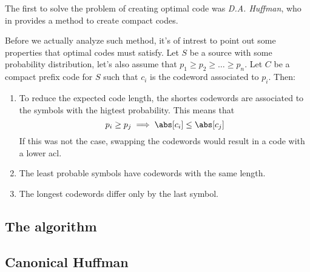 \documentclass{subfiles}
\begin{document}
\label{Sec:2}
    The first to solve the problem of creating optimal code was \emph{D.A. Huffman},
       who in \cite{huffman1952} provides a method to create compact codes.

        Before we actually analyze such method, 
            it's of intrest to point out some properties that optimal codes 
            must satisfy.
        Let \(S\) be a source with some probability distribution,
        let's also assume that \(p_{1} \ge p_{2} \ge \ldots \ge p_{n}\).
        Let \(C\) be a compact prefix code for \(S\) such that \(c_{i}\) is 
            the codeword associated to \(p_{i}\). Then:
        \begin{enumerate}
            \item To reduce the expected code length, 
                the shortes codewords are associated to the symbols with the higtest
                probability. This means that 
                \[
                    p_{i} \ge p_{j} \implies \abs[c_{i}] \le \abs[c_{j}]
                \]
                If this was not the case, 
                swapping the codewords would result in a code with a lower \gls{acl}.

            \item The least probable symbols have codewords with the same length.
            \item The longest codewords differ only by the last symbol.
        \end{enumerate}

        \subsection{The algorithm}
        

        \subsection{Canonical Huffman}
        
\end{document}
